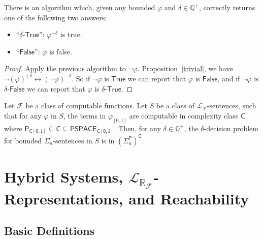 \documentclass[envcountsect]{llncs}
\newcommand{\lrf}{\mathcal{L}_{\mathbb{R}_{\mathcal{F}}}}
\begin{document}
\begin{corollary}
There is an algorithm which, given any bounded $\varphi$ and $\delta\in
\mathbb{Q}^+$,  correctly returns one of the following two answers:
\begin{itemize}
\item ``$\delta$-$\mathsf{True}$'': $\varphi^{-\delta}$ is true. 
\item ``$\mathsf{False}$'': $\varphi$ is false. 
\end{itemize} 
\end{corollary}

\begin{proof}
Apply the previous algorithm to $\neg\varphi$. Proposition~\ref{trivial}, we
have  $\neg(\varphi)^{+\delta}\leftrightarrow (\neg\varphi)^{-\delta}$. So if
$\neg\varphi$ is $\mathsf{True}$ we can report that $\varphi$ is
$\mathsf{False}$, and if $\neg\varphi$ is $\delta$-$\mathsf{False}$ we can
report that $\varphi$ is $\delta$-$\mathsf{True}$.
\end{proof}

\begin{theorem}\label{compmain}
Let $\mathcal{F}$ be a class of computable functions. Let $S$ be a class of 
$\mathcal{L}_{\mathcal{F}}$-sentences, such that for any $\varphi$ in $S$, the
terms in $\varphi_{[0,1]}$ are computable in complexity class $\mathsf{C}$ where
$\mathsf{P_{C[0,1]}\subseteq \mathsf{C}\subseteq \mathsf{PSPACE_{C[0,1]}}}$.
Then, for any $\delta\in \mathbb{Q}^+$, the $\delta$-decision problem for
bounded $\Sigma_n$-sentences in $S$ is in $\mathsf{(\Sigma_n^P)^C}$.
\end{theorem}


\section{Hybrid Systems, $\lrf$-Representations, and Reachability}

\subsection{Basic Definitions}
\end{document}

